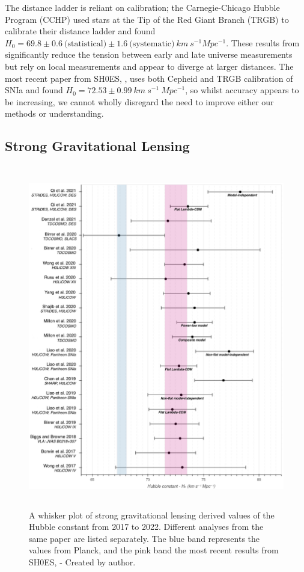 \documentclass[12pt]{report}
\begin{document}
The distance ladder is reliant on calibration; the Carnegie-Chicago Hubble Program (CCHP) used stars at the Tip of the Red Giant Branch (TRGB) to calibrate their distance ladder and found $H_{0} = 69.8 \pm 0.6 \ \text{(statistical)} \pm 1.6 \ \text{(systematic)} \ km \ s^{-1} Mpc^{-1}$. These results from \textcite{Freedman2021} significantly reduce the tension between early and late universe measurements but rely on local measurements and appear to diverge at larger distances. The most recent paper from SH0ES, \textcite{Riess2022}, uses both Cepheid and TRGB calibration of SNIa and found $H_{0} = 72.53 \pm 0.99 \ km \ s^{-1} \ Mpc^{-1}$, so whilst accuracy appears to be increasing, we cannot wholly disregard the need to improve either our methods or understanding.

\newpage

\subsection{Strong Gravitational Lensing}

\vspace{-0.5cm}

\begin{figure} [ht!]
    \centering
    \includegraphics[width = \textwidth, height = 15cm]{figure4.jpg}
    \caption{A whisker plot of strong gravitational lensing derived values of the Hubble constant from 2017 to 2022. Different analyses from the same paper are listed separately. The blue band represents the values from Planck, \textcite{Aghanim2020} and the pink band the most recent results from SH0ES, \textcite{Riess2022} - Created by author.}
    \label{fig:figure4}
\end{figure}
\end{document}
